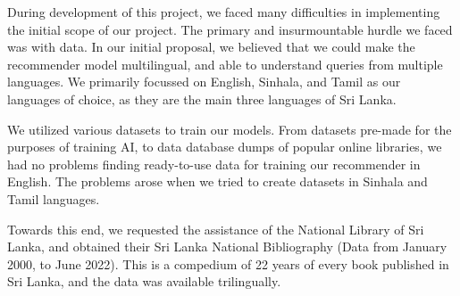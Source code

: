 During development of this project, we faced many difficulties in implementing the initial scope of our project. The primary and insurmountable hurdle we faced was with data. In our initial proposal, we believed that we could make the recommender model multilingual, and able to understand queries from multiple languages. We primarily focussed on English, Sinhala, and Tamil as our languages of choice, as they are the main three languages of Sri Lanka.

We utilized various datasets to train our models. From datasets pre-made for the purposes of training AI, to data database dumps of popular online libraries, we had no problems finding ready-to-use data for training our recommender in English. The problems arose when we tried to create datasets in Sinhala and Tamil languages.

Towards this end, we requested the assistance of the National Library of Sri Lanka, and obtained their Sri Lanka National Bibliography (Data from January 2000, to June 2022). This is a compedium of 22 years of every book published in Sri Lanka, and the data was available trilingually.